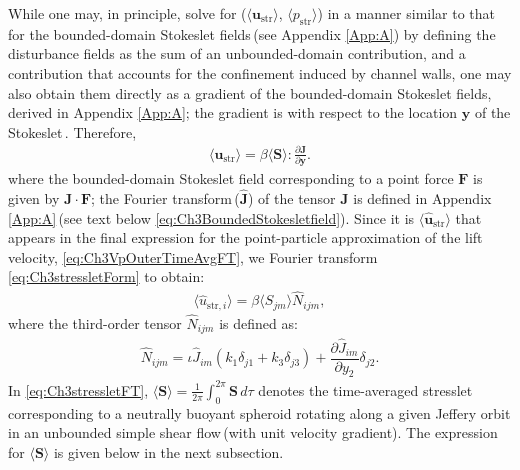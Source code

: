 \documentclass{jfm}
\begin{document}
While one may, in principle, solve for ($\langle\bm{u}_\text{str}\rangle$, $\langle p_\text{str}\rangle$) in a manner similar to that for the bounded-domain Stokeslet fields\,(see Appendix \ref{App:A}) by defining the disturbance fields as the sum of an unbounded-domain contribution, and a contribution that accounts for the confinement induced by channel walls, one may also obtain them directly as a gradient of the bounded-domain Stokeslet fields, derived in Appendix \ref{App:A}; the gradient is with respect to the location $\bm{y}$ of the Stokeslet\,\citep{brady2010}. Therefore,
\begin{align}
\langle\bm{u}_\text{str}\rangle=\beta\langle\bm{S}\rangle:\frac{\partial\bm{J}}{\partial\bm{y}}.
\label{eq:Ch3stressletForm}
\end{align}
where the bounded-domain Stokeslet field corresponding to a point force $\bm{F}$ is given by $\bm{J}\cdot \bm{F}$; the Fourier transform\,($\hat{\bm{J}}$) of the tensor $\bm{J}$ is defined in Appendix \ref{App:A}\,(see text below \eqref{eq:Ch3BoundedStokesletfield}). Since it is $\langle \hat{\bm{u}}_\text{str} \rangle$ that appears in the final expression for the point-particle approximation of the 
lift velocity, \eqref{eq:Ch3VpOuterTimeAvgFT}, we Fourier transform \eqref{eq:Ch3stressletForm} to obtain:
\begin{align}
\langle\hat{u}_{\text{str},i}\rangle=\beta \langle S_{jm}\rangle\hat{N}_{ijm},
\label{eq:Ch3stressletFT}
\end{align}
where the third-order tensor $\hat{N}_{ijm}$ is defined as:
\begin{align}
\hat{N}_{ijm}=\iota\hat{J}_{im}(k_1 \delta_{j1}+k_3 \delta_{j3})+\dfrac{\partial\hat{J}_{im}}{\partial y_2}\delta_{j2}.
\end{align}
In \eqref{eq:Ch3stressletFT}, $\langle\bm{S}\rangle=\frac{1}{2\pi}\int_0^{2\pi} \bm{S}\,d\tau$ denotes the time-averaged stresslet corresponding to a neutrally buoyant spheroid rotating along a given Jeffery orbit in an unbounded simple shear flow\,(with unit velocity gradient). The expression for $\langle \bm{S}\rangle$ is given below in the next subsection.
\end{document}
